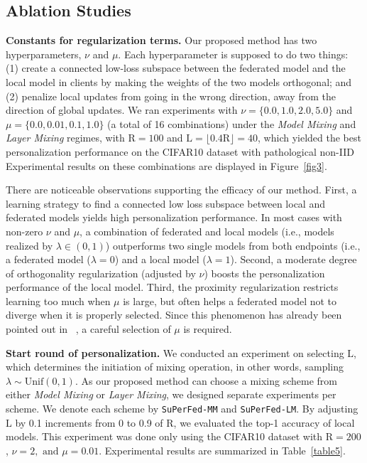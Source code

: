 \documentclass[sigconf]{acmart}
\begin{document}
\subsection{Ablation Studies} 
\noindent\textbf{Constants for regularization terms.} 
Our proposed method has two hyperparameters, $\nu$ and $\mu$. Each hyperparameter is supposed to do two things: (1) create a connected low-loss subspace between the federated model and the local model in clients by making the weights of the two models orthogonal; and (2) penalize local updates from going in the wrong direction, away from the direction of global updates.
We ran experiments with $\nu=\{0.0, 1.0, 2.0, 5.0\}$ and $\mu=\{0.0, 0.01, 0.1, 1.0\}$ (a total of 16 combinations) under the \textit{Model Mixing} and \textit{Layer Mixing} regimes, with $\mathrm{R}=100$ and $\mathrm{L}=\lfloor0.4\mathrm{R}\rfloor=40$, which yielded the best personalization performance on the CIFAR10 dataset with pathological non-IID Experimental results on these combinations are displayed in Figure~\ref{fig3}.

There are noticeable observations supporting the efficacy of our method. First, a learning strategy to find a connected low loss subspace between local and federated models yields high personalization performance. In most cases with non-zero $\nu$ and $\mu$, a combination of federated and local models (i.e., models realized by $\lambda\in(0,1)$) outperforms two single models from both endpoints (i.e., a federated model ($\lambda=0$) and a local model ($\lambda=1$). Second, a moderate degree of orthogonality regularization (adjusted by $\nu$) boosts the personalization performance of the local model.
Third, the proximity regularization restricts learning too much when $\mu$ is large, but often helps a federated model not to diverge when it is properly selected. Since this phenomenon has already been pointed out in ~\cite{fedprox, pfedme}, a careful selection of $\mu$ is required.

\smallskip
\noindent\textbf{Start round of personalization.} We conducted an experiment on selecting $\mathrm{L}$, which determines the initiation of mixing operation, in other words, sampling $\lambda\sim\text{Unif}(0, 1)$. As our proposed method can choose a mixing scheme from either \textit{Model Mixing} or \textit{Layer Mixing}, we designed separate experiments per scheme. We denote each scheme by \texttt{SuPerFed-MM} and \texttt{SuPerFed-LM}. By adjusting $\mathrm{L}$ by 0.1 increments from 0 to 0.9 of $\mathrm{R}$, we evaluated the top-1 accuracy of local models. This experiment was done only using the CIFAR10 dataset with $\mathrm{R}=200$, $\nu=2,\text{ and } \mu=0.01$. Experimental results are summarized in Table~\ref{table5}. 
\end{document}
